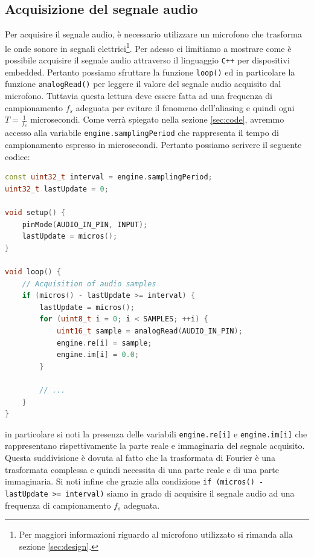 \documentclass[a4paper,12pt]{report}  %
\newcommand{\lstinlinebg}[1]{\colorbox{backcolour}{\lstinline|#1|}}
\begin{document}
\subsection{Acquisizione del segnale audio}\label{sec:acquisition}
Per acquisire il segnale audio, è necessario utilizzare un microfono che trasforma le onde sonore in segnali elettrici\footnote{Per maggiori informazioni riguardo al microfono utilizzato si rimanda alla sezione \ref{sec:design}.}.
Per adesso ci limitiamo a mostrare come è possibile acquisire il segnale audio attraverso il linguaggio \lstinlinebg{C++} per dispositivi embedded.
Pertanto possiamo sfruttare la funzione \lstinlinebg{loop()} ed in particolare la funzione \lstinlinebg{analogRead()} per leggere il valore del segnale audio acquisito dal microfono.
Tuttavia questa lettura deve essere fatta ad una frequenza di campionamento $f_s$ adeguata per evitare il fenomeno dell'aliasing e quindi ogni $T = \frac{1}{f_s}$ microsecondi.
Come verrà spiegato nella sezione \ref{sec:code}, avremmo accesso alla variabile \lstinlinebg{engine.samplingPeriod} che rappresenta il tempo di campionamento espresso in microsecondi.
Pertanto possiamo scrivere il seguente codice:

\begin{lstlisting}[language=C++,keywords={const, uint8_t, if, for, void, Serial, begin, uint16_t, analogRead, println, uint32_t, micros, pinMode, INPUT}]
const uint32_t interval = engine.samplingPeriod;
uint32_t lastUpdate = 0;

void setup() {
    pinMode(AUDIO_IN_PIN, INPUT);
    lastUpdate = micros();
}

void loop() {
    // Acquisition of audio samples
    if (micros() - lastUpdate >= interval) {
        lastUpdate = micros();
        for (uint8_t i = 0; i < SAMPLES; ++i) {
            uint16_t sample = analogRead(AUDIO_IN_PIN);
            engine.re[i] = sample;
            engine.im[i] = 0.0;
        }

        // ...
    }
}
\end{lstlisting}

in particolare si noti la presenza delle variabili \lstinlinebg{engine.re[i]} e \lstinlinebg{engine.im[i]} che rappresentano rispettivamente la parte reale e immaginaria del segnale acquisito.
Questa suddivisione è dovuta al fatto che la trasformata di Fourier è una trasformata complessa e quindi necessita di una parte reale e di una parte immaginaria.
Si noti infine che grazie alla condizione \lstinlinebg{if (micros() - lastUpdate >= interval)} siamo in grado di acquisire il segnale audio ad una frequenza di campionamento $f_s$ adeguata.
\end{document}
